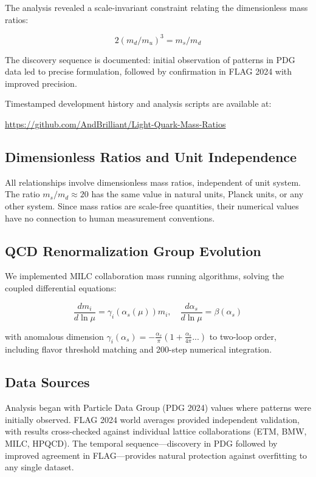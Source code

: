 \documentclass[12pt]{article}
\begin{document}
The analysis revealed a scale-invariant constraint relating the dimensionless mass ratios:

\begin{equation}
2(m_d/m_u)^3 = m_s/m_d
\end{equation}

The discovery sequence is documented: initial observation of patterns in PDG data led to precise formulation, followed by confirmation in FLAG 2024 with improved precision.

Timestamped development history and analysis scripts are available at:

\url{https://github.com/AndBrilliant/Light-Quark-Mass-Ratios}

\subsection{Dimensionless Ratios and Unit Independence}

All relationships involve dimensionless mass ratios, independent of unit system. The ratio $m_s/m_d \approx 20$ has the same value in natural units, Planck units, or any other system. Since mass ratios are scale-free quantities, their numerical values have no connection to human measurement conventions.

\subsection{QCD Renormalization Group Evolution}

We implemented MILC collaboration mass running algorithms, solving the coupled differential equations:

\begin{equation}
\frac{dm_i}{d\ln\mu} = \gamma_i(\alpha_s(\mu))m_i,\quad \frac{d\alpha_s}{d\ln\mu} = \beta(\alpha_s)
\end{equation}

with anomalous dimension $\gamma_i(\alpha_s) = -\frac{\alpha_s}{\pi}\left(1 + \frac{\alpha_s}{4\pi}...\right)$ to two-loop order, including flavor threshold matching and 200-step numerical integration.

\subsection{Data Sources}

Analysis began with Particle Data Group (PDG 2024) values where patterns were initially observed. FLAG 2024 world averages provided independent validation, with results cross-checked against individual lattice collaborations (ETM, BMW, MILC, HPQCD). The temporal sequence—discovery in PDG followed by improved agreement in FLAG—provides natural protection against overfitting to any single dataset.
\end{document}
